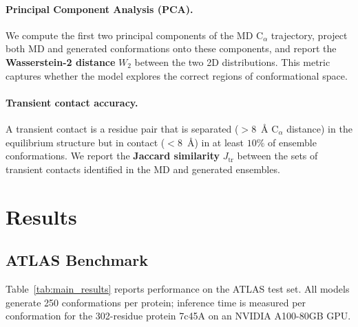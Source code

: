 \documentclass[12pt,a4paper]{article}
\begin{document}
\paragraph{Principal Component Analysis (PCA).}
We compute the first two principal components of the MD C$_\alpha$ trajectory, project both
MD and generated conformations onto these components, and report the \textbf{Wasserstein-2
distance} $W_2$ between the two 2D distributions.  This metric captures whether the model
explores the correct regions of conformational space.

\paragraph{Transient contact accuracy.}
A transient contact is a residue pair that is separated ($> 8$~Å C$_\alpha$ distance) in
the equilibrium structure but in contact ($< 8$~Å) in at least $10\%$ of ensemble conformations.
We report the \textbf{Jaccard similarity} $J_{\mathrm{tr}}$ between the sets of transient
contacts identified in the MD and generated ensembles.

\section{Results}
\label{sec:results}

\subsection{ATLAS Benchmark}
\label{sec:atlas_results}

Table~\ref{tab:main_results} reports performance on the ATLAS test set.  All models generate
250 conformations per protein; inference time is measured per conformation for the
302-residue protein 7c45A on an NVIDIA A100-80GB GPU.
\end{document}
